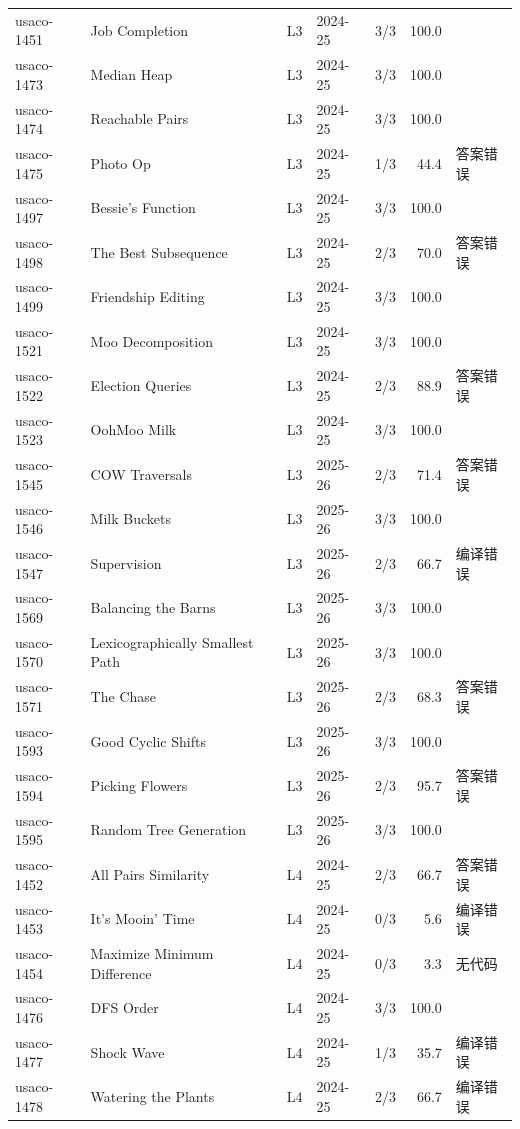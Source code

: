 \documentclass[11pt,a4paper,fontset=none]{ctexart}
\begin{document}
{\begin{longtable}{@{}l>{\raggedright\arraybackslash}p{3.4cm}llrr>{\raggedright\arraybackslash}p{3.1cm}@{}}
usaco-1451 & Job Completion & L3 & 2024-25 & 3/3 & 100.0 &  \\
usaco-1473 & Median Heap & L3 & 2024-25 & 3/3 & 100.0 &  \\
usaco-1474 & Reachable Pairs & L3 & 2024-25 & 3/3 & 100.0 &  \\
usaco-1475 & Photo Op & L3 & 2024-25 & 1/3 & 44.4 & 答案错误 \\
usaco-1497 & Bessie's Function & L3 & 2024-25 & 3/3 & 100.0 &  \\
usaco-1498 & The Best Subsequence & L3 & 2024-25 & 2/3 & 70.0 & 答案错误 \\
usaco-1499 & Friendship Editing & L3 & 2024-25 & 3/3 & 100.0 &  \\
usaco-1521 & Moo Decomposition & L3 & 2024-25 & 3/3 & 100.0 &  \\
usaco-1522 & Election Queries & L3 & 2024-25 & 2/3 & 88.9 & 答案错误 \\
usaco-1523 & OohMoo Milk & L3 & 2024-25 & 3/3 & 100.0 &  \\
usaco-1545 & COW Traversals & L3 & 2025-26 & 2/3 & 71.4 & 答案错误 \\
usaco-1546 & Milk Buckets & L3 & 2025-26 & 3/3 & 100.0 &  \\
usaco-1547 & Supervision & L3 & 2025-26 & 2/3 & 66.7 & 编译错误 \\
usaco-1569 & Balancing the Barns & L3 & 2025-26 & 3/3 & 100.0 &  \\
usaco-1570 & Lexicographically Smallest Path & L3 & 2025-26 & 3/3 & 100.0 &  \\
usaco-1571 & The Chase & L3 & 2025-26 & 2/3 & 68.3 & 答案错误 \\
usaco-1593 & Good Cyclic Shifts & L3 & 2025-26 & 3/3 & 100.0 &  \\
usaco-1594 & Picking Flowers & L3 & 2025-26 & 2/3 & 95.7 & 答案错误 \\
usaco-1595 & Random Tree Generation & L3 & 2025-26 & 3/3 & 100.0 &  \\
usaco-1452 & All Pairs Similarity & L4 & 2024-25 & 2/3 & 66.7 & 答案错误 \\
usaco-1453 & It's Mooin' Time & L4 & 2024-25 & 0/3 & 5.6 & 编译错误 \\
usaco-1454 & Maximize Minimum Difference & L4 & 2024-25 & 0/3 & 3.3 & 无代码 \\
usaco-1476 & DFS Order & L4 & 2024-25 & 3/3 & 100.0 &  \\
usaco-1477 & Shock Wave & L4 & 2024-25 & 1/3 & 35.7 & 编译错误 \\
usaco-1478 & Watering the Plants & L4 & 2024-25 & 2/3 & 66.7 & 编译错误 \\

\end{longtable}}
\end{document}
